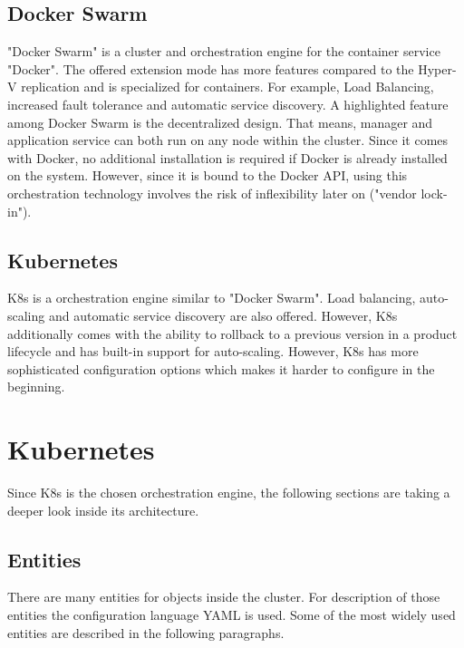 \subsection{Docker Swarm} "Docker Swarm" is a cluster and orchestration engine for the container service "Docker". The offered extension mode has more features compared to the Hyper-V replication and is specialized for containers. For example, Load Balancing, increased fault tolerance and automatic service discovery.
A highlighted feature among Docker Swarm is the decentralized design. That means, manager and application service can both run on any node within the cluster. Since it comes with Docker, no additional installation is required if Docker is already installed on the system.
However, since it is bound to the Docker \ac{API}, using this orchestration technology involves the risk of inflexibility later on ("vendor lock-in").

 
\subsection{Kubernetes}
\acf{K8s} is a orchestration engine similar to "Docker Swarm". Load balancing, auto-scaling and automatic service discovery are also offered. However, \ac{K8s} additionally comes with the ability to rollback to a previous version in a product lifecycle and has built-in support for auto-scaling.
However, \ac{K8s} has more sophisticated configuration options which makes it harder to configure in the beginning.


\section{Kubernetes}
Since \ac{K8s} is the chosen orchestration engine, the following sections are taking a deeper look inside its architecture.

\subsection{Entities}
There are many entities for objects inside the cluster. For description of those entities the configuration language YAML is used. Some of the most widely used entities are described in the following paragraphs.

